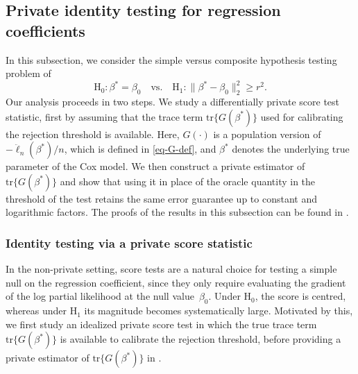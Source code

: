 \documentclass[11pt]{article}
\begin{document}
\subsection{Private identity testing for regression coefficients}\label{sec-3}
In this subsection, we consider the simple versus composite hypothesis testing problem of
\begin{equation} \label{eq-test-good-reg}
    \mathrm{H}_0: \beta^* = \beta_0 \quad \mbox{vs.} \quad \mathrm{H}_1: \|\beta^* - \beta_0\|_2^2 \geq r^2.
\end{equation}
 Our analysis proceeds in two steps. We study a differentially private score test statistic, first by assuming that the trace term $\mathrm{tr}\{G(\beta^*)\}$ used for calibrating the rejection threshold is available. Here, $G(\cdot)$ is a population version of $-\ddot{\ell}_n(\beta^*)/n$, which is defined in \eqref{eq-G-def}, and $\beta^*$ denotes the underlying true parameter of the Cox model. We then construct a private estimator of $\mathrm{tr}\{G(\beta^*)\}$ and show that using it in place of the oracle quantity in the threshold of the test retains the same error guarantee up to constant and logarithmic factors. The proofs of the results in this subsection can be found in . 

\subsubsection{Identity testing via a private score statistic}
In the non-private setting, score tests are a natural choice for testing a simple null on the regression coefficient, since they only require evaluating the gradient of the log partial likelihood at the null value~$\beta_0$. Under $\mathrm{H}_0$, the score is centred, whereas under $\mathrm{H}_1$ its magnitude becomes systematically large. Motivated by this, we first study an idealized private score test in which the true trace term $\mathrm{tr}\{G(\beta^*)\}$ is available to calibrate the rejection threshold, before providing a private estimator of $\mathrm{tr}\{G(\beta^*)\}$ in . 
\end{document}
